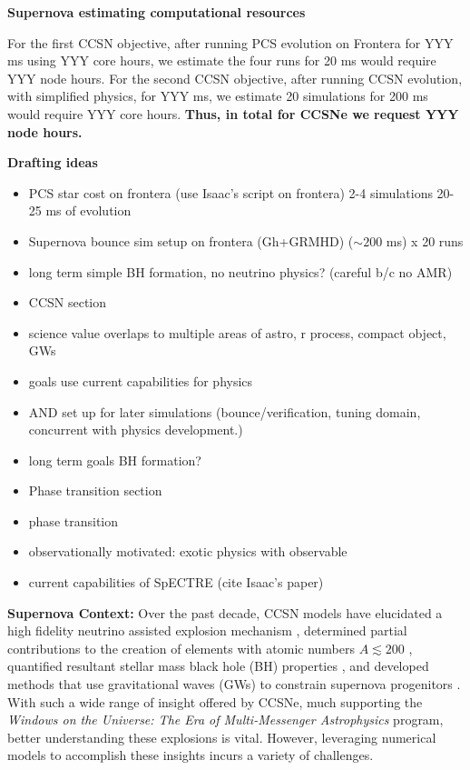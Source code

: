 \documentclass[12pt]{article}
\begin{document}
\textbf{Supernova estimating computational resources}

For the first CCSN objective, after running PCS evolution on Frontera for YYY ms using YYY core hours, we estimate the four runs for 20 ms would require YYY node hours.  For the second CCSN objective, after running CCSN evolution, with simplified physics, for YYY ms, we estimate 20 simulations for 200 ms would require YYY core hours.  \textbf{Thus, in total for CCSNe we request YYY node hours.}

\textbf{Drafting ideas}

\begin{itemize}
    \item PCS star cost on frontera (use Isaac's script on frontera) 2-4 simulations 20-25 ms of evolution
    \item Supernova bounce sim setup on frontera (Gh+GRMHD) ($\sim 200$ ms) x 20 runs
    \item long term simple BH formation, no neutrino physics? (careful b/c no AMR)
\end{itemize}

\begin{itemize}
    \item CCSN section
    \item science value overlaps to multiple areas of astro, r process, compact object, GWs
    \item goals use current capabilities for physics
    \item AND set up for later simulations (bounce/verification, tuning domain, concurrent with physics development.)
    \item long term goals BH formation?
\end{itemize}

\begin{itemize}
    \item Phase transition section
    \item phase transition
    \item observationally motivated: exotic physics with observable
    \item current capabilities of SpECTRE (cite Isaac's paper)
\end{itemize}

\textbf{Supernova Context:} Over the past decade, CCSN models have elucidated a high fidelity neutrino assisted explosion mechanism \citep{vartanyan:2022}, determined partial contributions to the creation of elements with atomic numbers $A \lesssim 200$ \citep{halevi:2018}, quantified resultant stellar mass black hole (BH) properties \citep{woosley:2020}, and developed methods that use gravitational waves (GWs) to constrain supernova progenitors \citep{pajkos:2021}.  With such a wide range of insight offered by CCSNe, much supporting the \textit{Windows on the Universe: The Era of Multi-Messenger Astrophysics} program, better understanding these explosions is vital. However, leveraging numerical models to accomplish these insights incurs a variety of challenges.
\end{document}
